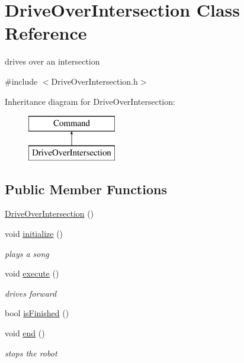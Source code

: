 \hypertarget{classDriveOverIntersection}{\section{Drive\-Over\-Intersection Class Reference}
\label{classDriveOverIntersection}
}


drives over an intersection  




{\ttfamily \#include $<$Drive\-Over\-Intersection.\-h$>$}

Inheritance diagram for Drive\-Over\-Intersection\-:\begin{figure}[H]
\begin{center}
\leavevmode
\includegraphics[height=2.000000cm]{classDriveOverIntersection}
\end{center}
\end{figure}
\subsection*{Public Member Functions}
\begin{DoxyCompactItemize}
\item 
\hyperlink{classDriveOverIntersection_a4fd6378b9ef223d86eebdf4af0547752}{Drive\-Over\-Intersection} ()
\item 
void \hyperlink{classDriveOverIntersection_a1c8abfebdde3f16e3110bca280365640}{initialize} ()
\begin{DoxyCompactList}\small\item\em plays a song \end{DoxyCompactList}\item 
void \hyperlink{classDriveOverIntersection_a0bb9f5c91c23583810510f60cdd49523}{execute} ()
\begin{DoxyCompactList}\small\item\em drives forward \end{DoxyCompactList}\item 
bool \hyperlink{classDriveOverIntersection_a5dc540c24099462e2bc14923648f42b0}{is\-Finished} ()
\item 
void \hyperlink{classDriveOverIntersection_a90d8b3592d6c67e9ef1ae1a6396aa1c2}{end} ()
\begin{DoxyCompactList}\small\item\em stops the robot \end{DoxyCompactList}\end{DoxyCompactItemize}
